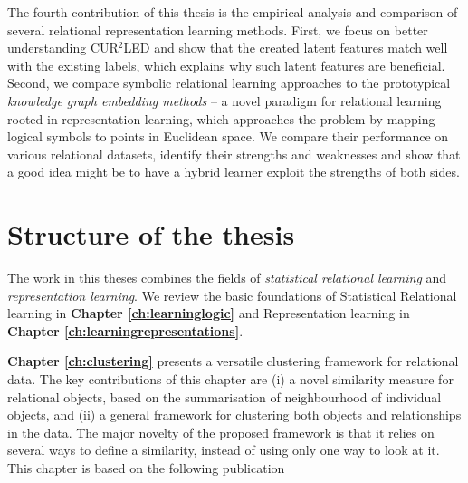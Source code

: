 The fourth contribution of this thesis is the empirical analysis and comparison of several relational representation learning methods.
First, we focus on better understanding CUR$^2$LED and show that the created latent features match well with the existing labels, which explains why such latent features are beneficial.
Second, we compare symbolic relational learning approaches to the prototypical \textit{knowledge graph embedding methods} -- a novel paradigm for relational learning rooted in representation learning, which approaches the problem by mapping logical symbols to points in Euclidean space.
We compare their performance on various relational datasets, identify their strengths and weaknesses and show that a good idea might be to have a hybrid learner exploit the strengths of both sides.








\section{Structure of the thesis}


The work in this theses combines the fields of \textit{statistical relational learning} and \textit{representation learning}.
We review the basic foundations of Statistical Relational learning in \textbf{Chapter \ref{ch:learninglogic}} and Representation learning in \textbf{Chapter \ref{ch:learningrepresentations}}.


\textbf{Chapter \ref{ch:clustering}} presents a versatile clustering framework for relational data.
The key contributions of this chapter are (i) a novel similarity measure for relational objects, based on the summarisation of neighbourhood of individual objects, and (ii) a general framework for clustering both objects and relationships in the data.
The major novelty of the proposed framework is that it relies on several ways to define a similarity, instead of using only one way to look at it.
This chapter is based on the following publication

\begin{quote}
\end{quote}





